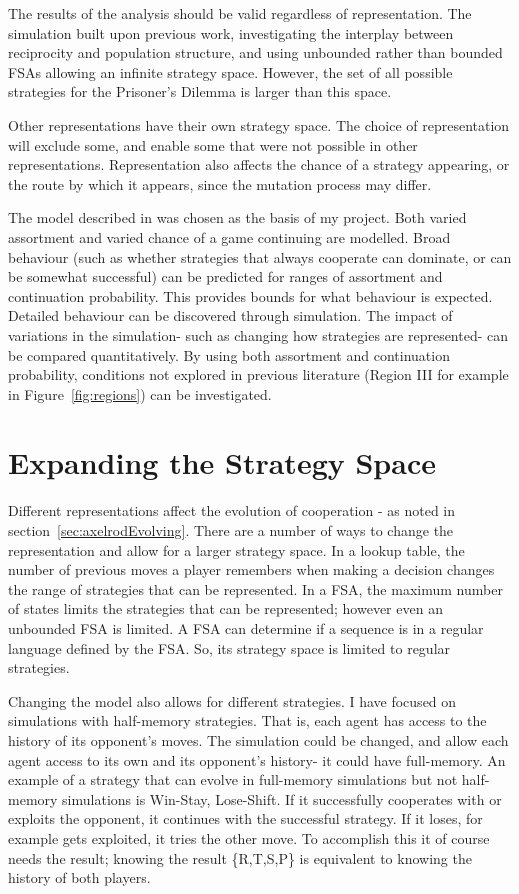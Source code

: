 \documentclass[a4paper,11pt,bcshonoursthesis,singlespace,twoside]{cssethesis}
\begin{document}
The results of the analysis should be valid regardless of representation. The simulation built upon previous work, investigating the interplay between reciprocity and population structure, and using unbounded rather than bounded FSAs allowing an infinite strategy space. 
However, the set of all possible strategies for the Prisoner's Dilemma is larger than this space. 

Other representations have their own strategy space. 
The choice of representation will exclude some, and enable some that were not possible in other representations. 
Representation also affects the chance of a strategy appearing, or the route by which it appears, since the mutation process may differ.
 
The model described in \citet{van-veelen:PNAS:2012} was chosen as the basis of my project. 
Both varied assortment and varied chance of a game continuing are modelled. 
Broad behaviour (such as whether strategies that always cooperate can dominate, or can be somewhat successful) can be predicted for ranges of assortment and continuation probability. This provides bounds for what behaviour is expected. 
Detailed behaviour can be discovered through simulation. 
The impact of variations in the simulation- such as changing how strategies are represented- can be compared quantitatively.
By using both assortment and continuation probability, conditions not explored in previous literature (Region III for example in Figure~\ref{fig:regions}) can be investigated.


\section{Expanding the Strategy Space}
\label{sec:stratspace}
Different representations affect the evolution of cooperation - as noted in section~\ref{sec:axelrodEvolving}. 
There are a number of ways to change the representation and allow for a larger strategy space. 
In a lookup table, the number of previous moves a player remembers when making a decision changes the range of strategies that can be represented. 
In a FSA, the maximum number of states limits the strategies that can be represented; however even an unbounded FSA is limited. 
A FSA can determine if a sequence is in a regular language defined by the FSA. 
So, its strategy space is limited to regular strategies. 

Changing the model also allows for different strategies. 
I have focused on simulations with half-memory strategies. 
That is, each agent has access to the history of its opponent's moves. 
The simulation could be changed, and allow each agent access to its own and its opponent's history- it could have full-memory. 
An example of a strategy that can evolve in full-memory simulations but not half-memory simulations is Win-Stay, Lose-Shift. If it successfully cooperates with or exploits the opponent, it continues with the successful strategy. If it loses, for example gets exploited, it tries the other move. 
To accomplish this it of course needs the result; knowing the result \{R,T,S,P\} is equivalent to knowing the history of both players.
\end{document}
